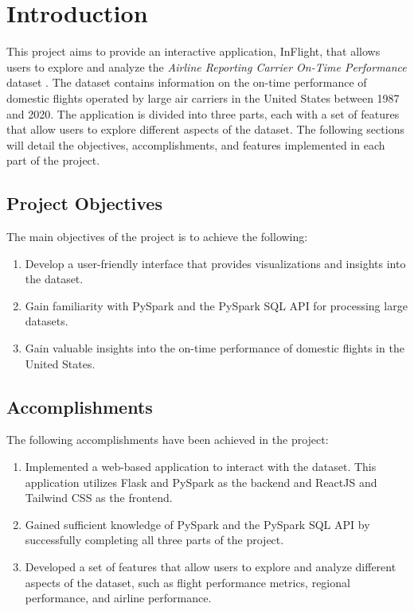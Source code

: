 \section{Introduction}
This project aims to provide an interactive application, InFlight, that allows users to explore and analyze the \textit{Airline Reporting Carrier On-Time Performance} dataset \cite{usdot2023}. The dataset contains information on the on-time performance of domestic flights operated by large air carriers in the United States between 1987 and 2020. The application is divided into three parts, each with a set of features that allow users to explore different aspects of the dataset. The following sections will detail the objectives, accomplishments, and features implemented in each part of the project.

\subsection{Project Objectives}
The main objectives of the project is to achieve the following:
\begin{enumerate}
    \item Develop a user-friendly interface that provides visualizations and insights into the dataset.
    \item Gain familiarity with PySpark and the PySpark SQL API for processing large datasets.
    \item Gain valuable insights into the on-time performance of domestic flights in the United States.
\end{enumerate}

\subsection{Accomplishments}
The following accomplishments have been achieved in the project:
\begin{enumerate}
    \item Implemented a web-based application to interact with the dataset. This application utilizes Flask and PySpark as the backend and ReactJS and Tailwind CSS as the frontend.
    \item Gained sufficient knowledge of PySpark and the PySpark SQL API by successfully completing all three parts of the project.
    \item Developed a set of features that allow users to explore and analyze different aspects of the dataset, such as flight performance metrics, regional performance, and airline performance.
\end{enumerate}

